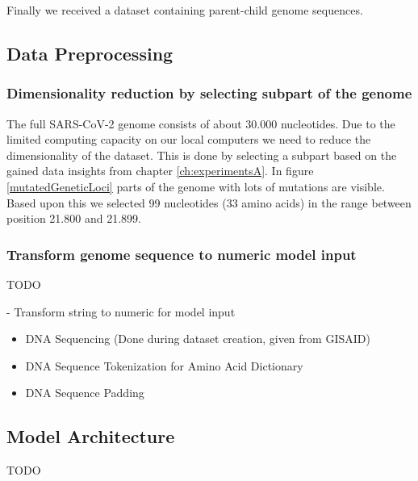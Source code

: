 Finally we received a dataset containing parent-child genome sequences.

\subsection{Data Preprocessing}  \label{ch:approachB}

\subsubsection{Dimensionality reduction by selecting subpart of the genome}
\label{ch:approachBa}

The full \ac{SARS-CoV-2} genome consists of about 30.000 nucleotides. Due to the limited computing capacity on our local computers we need to reduce the dimensionality of the dataset. This is done by selecting a subpart based on the gained data insights from chapter \ref{ch:experimentsA}. In figure \ref{mutatedGeneticLoci} parts of the genome with lots of mutations are visible. Based upon this we selected 99 nucleotides (33 amino acids) in the range between position 21.800 and 21.899.

\subsubsection{Transform genome sequence to numeric model input}
\label{ch:approachBb}

TODO

- Transform string to numeric for model input

\begin{itemize}
	\item DNA Sequencing (Done during dataset creation, given from GISAID)
	\item DNA Sequence Tokenization for Amino Acid Dictionary
	\item DNA Sequence Padding
\end{itemize}

\subsection{Model Architecture}  \label{ch:approachC}

TODO


